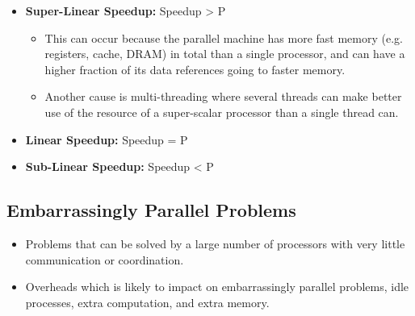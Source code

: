 \documentclass[../main.tex]{subfiles}
\begin{document}
\begin{itemize}
	\item \textbf{Super-Linear Speedup:} Speedup > P
	      \begin{itemize}
		      \item This can occur because the parallel machine has more fast memory (e.g. registers, cache, DRAM) in total than a single processor, and can have a higher fraction of its data references going to faster memory.
		      \item Another cause is multi-threading where several threads can make better use of the resource of a super-scalar processor than a single thread can.
	      \end{itemize}
	\item \textbf{Linear Speedup:} Speedup = P
	\item \textbf{Sub-Linear Speedup:} Speedup < P
\end{itemize}

\subsection{Embarrassingly Parallel Problems}

\begin{itemize}
	\item Problems that can be solved by a large number of processors with very little communication or coordination.
	\item Overheads which is likely to impact on embarrassingly parallel problems, idle processes, extra computation, and extra memory.
\end{itemize}
\end{document}
